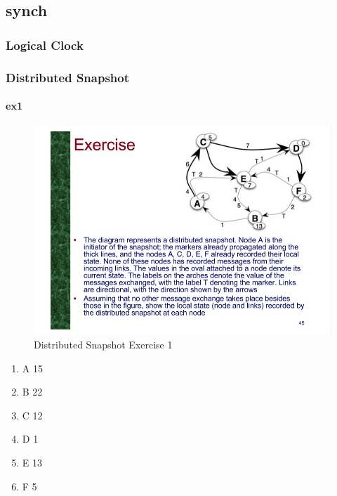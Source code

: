 \documentclass[11pt]{article}
\begin{document}
\subsection{synch} %
\label{sub:synch}
\subsubsection{Logical Clock} %
\label{ssub:logical_clock}

\subsubsection{Distributed Snapshot} %
\label{ssub:distributed_snapshot}
\paragraph{ex1} %
\label{par:ex1}
\begin{figure}[ht]
	\centering
	\includegraphics[scale=0.7]{figures/exercise_synch_3.jpg}
	\caption{Distributed Snapshot Exercise 1}
	\label{fig:dse1}
\end{figure}
\begin{enumerate}
	\item A 15
	\item B 22
	\item C 12
	\item D 1
	\item E 13
	\item F 5
\end{enumerate}
\end{document}

